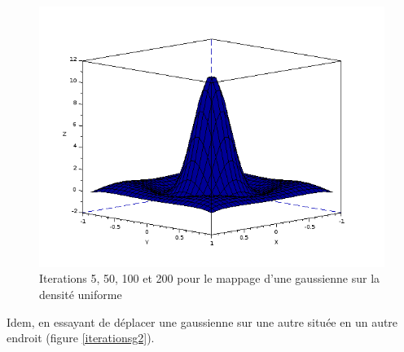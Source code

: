 \documentclass[12pt,a4paper,twoside]{article}
\begin{document}
\begin{figure}
\begin{center}
\includegraphics[scale=0.35]{Images/itergaussienne3.png}
\caption{Iterations 5, 50, 100 et 200 pour le mappage d'une gaussienne sur la densité uniforme}
\label{iterationsg}
\end{center}
\end{figure}


Idem, en essayant de déplacer une gaussienne sur une autre située en un autre endroit (figure \ref{iterationsg2}).
\end{document}
